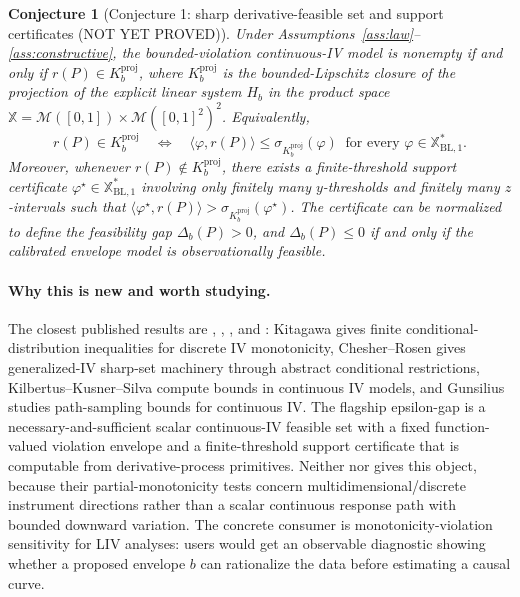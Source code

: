 \documentclass[11pt]{article}
\theoremstyle{definition}
\theoremstyle{plain}
\newtheorem{conjecture}{Conjecture}
\theoremstyle{remark}
\begin{document}
\begin{conjecture}[Conjecture 1: sharp derivative-feasible set and support certificates (NOT YET PROVED)]\label{conj:feasible}
Under Assumptions~\ref{ass:law}--\ref{ass:constructive}, the bounded-violation continuous-IV model is nonempty if and only if \(r(P)\in K_b^{\mathrm{proj}}\), where \(K_b^{\mathrm{proj}}\) is the bounded-Lipschitz closure of the projection of the explicit linear system \(H_b\) in the product space \(\mathbb X=\mathcal M([0,1])\times\mathcal M([0,1]^2)^2\).  Equivalently,
\[
r(P)\in K_b^{\mathrm{proj}}
\quad\Longleftrightarrow\quad
\langle\varphi,r(P)\rangle\le\sigma_{K_b^{\mathrm{proj}}}(\varphi)\ \text{ for every }\varphi\in\mathbb X^\ast_{\mathrm{BL},1}.
\]
Moreover, whenever \(r(P)\notin K_b^{\mathrm{proj}}\), there exists a finite-threshold support certificate \(\varphi^\star\in\mathbb X^\ast_{\mathrm{BL},1}\) involving only finitely many \(y\)-thresholds and finitely many \(z\)-intervals such that \(\langle\varphi^\star,r(P)\rangle>\sigma_{K_b^{\mathrm{proj}}}(\varphi^\star)\).  The certificate can be normalized to define the feasibility gap \(\Delta_b(P)>0\), and \(\Delta_b(P)\le0\) if and only if the calibrated envelope model is observationally feasible.
\end{conjecture}
\paragraph{Why this is new and worth studying.}
The closest published results are \citet{Kitagawa2015}, \citet{ChesherRosen2017}, \citet{KilbertusKusnerSilva2020}, and \citet{Gunsilius2019}: Kitagawa gives finite conditional-distribution inequalities for discrete IV monotonicity, Chesher--Rosen gives generalized-IV sharp-set machinery through abstract conditional restrictions, Kilbertus--Kusner--Silva compute bounds in continuous IV models, and Gunsilius studies path-sampling bounds for continuous IV.  The flagship epsilon-gap is a necessary-and-sufficient scalar continuous-IV feasible set with a fixed function-valued violation envelope and a finite-threshold support certificate that is computable from derivative-process primitives.  Neither \citet{MogstadTorgovitskyWalters2021} nor \citet{JiangSun2023PartialMonotonicityTest} gives this object, because their partial-monotonicity tests concern multidimensional/discrete instrument directions rather than a scalar continuous response path with bounded downward variation.  The concrete consumer is monotonicity-violation sensitivity for LIV analyses: \citet{KennedyLorchSmall2019} users would get an observable diagnostic showing whether a proposed envelope \(b\) can rationalize the data before estimating a causal curve.
\end{document}
